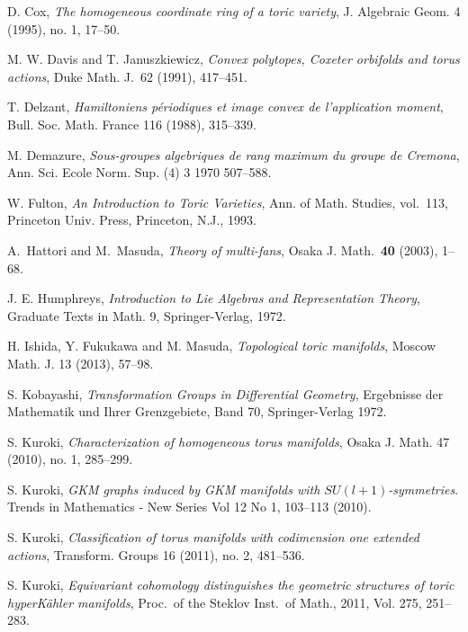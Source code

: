 \documentclass[12pt]{amsart}
\theoremstyle{plain} \numberwithin{equation}{section}
\theoremstyle{definition}
\begin{document}
\begin{thebibliography}{99}


D. Cox, 
\emph{The homogeneous coordinate ring of a toric variety}, 
J. Algebraic Geom. 4 (1995), no. 1, 17--50.

M. W. Davis and T. Januszkiewicz,
\emph{Convex polytopes, Coxeter orbifolds and torus actions},
Duke Math. J.~62 (1991), 417--451.

T. Delzant,
\emph{Hamiltoniens p\'eriodiques et image convex de l'application moment}, 
Bull. Soc. Math. France 116 (1988), 315--339. 

M. Demazure,
\emph{Sous-groupes algebriques de rang maximum du groupe de Cremona}, 
Ann. Sci. Ecole Norm. Sup. (4) 3 1970 507--588. 

W. Fulton,
\emph{An Introduction to Toric Varieties},
Ann. of Math. Studies, vol.~113, Princeton Univ. Press, Princeton, N.J.,
1993.

A.~Hattori and M.~Masuda,
\emph{Theory of multi-fans},
Osaka J. Math.~{\bf40} (2003), 1--68.

J. E. Humphreys,
\emph{Introduction to Lie Algebras and Representation Theory},
Graduate Texts in Math. 9, Springer-Verlag, 1972. 

H. Ishida, Y. Fukukawa and M. Masuda, 
\emph{Topological toric manifolds}, 
Moscow Math. J. 13 (2013), 57--98. 


S. Kobayashi,
\emph{Transformation Groups in Differential Geometry},
Ergebnisse der Mathematik und Ihrer Grenzgebiete, Band 70, 
Springer-Verlag 1972.  

S. Kuroki, 
\emph{Characterization of homogeneous torus manifolds}, 
Osaka J. Math. 47 (2010), no. 1, 285--299.

S. Kuroki, 
{\it GKM graphs induced by GKM manifolds with $SU(l+1)$-symmetries}. 
Trends in Mathematics - New Series Vol 12 No 1, 103--113 (2010).

S. Kuroki,
\emph{Classification of torus manifolds with codimension one extended actions}, 
Transform. Groups 16 (2011), no. 2, 481--536.

S. Kuroki,
\emph{Equivariant cohomology distinguishes the geometric structures of toric hyperK\"ahler manifolds}, 
Proc.\ of the Steklov Inst.\ of Math., 2011, Vol. 275, 251--283.


\end{thebibliography}
\end{document}
